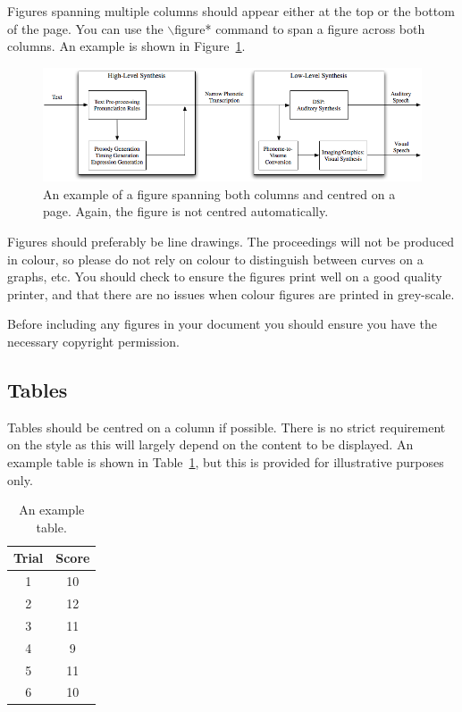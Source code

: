 \documentclass{cmppgr}
\begin{document}
Figures spanning multiple columns should appear either at the top or the bottom of the page. You can use the $\backslash$figure* command to span a figure across both columns. An example is shown in Figure~\ref{fig:pagefigure}.

\begin{figure}[tb]
\centering
\includegraphics[scale=0.5]{AVTTS-Overview}
\caption{An example of a figure spanning both columns and centred on a page. Again, the figure is not centred automatically.}
\label{fig:pagefigure}
\end{figure}

Figures should preferably be line drawings. The proceedings will not be produced in colour, so please do not rely on colour to distinguish between curves on a graphs, etc. You should check to ensure the figures print well on a good quality printer, and that there are no issues when colour figures are printed in grey-scale.

Before including any figures in your document you should ensure you have the necessary copyright permission.

\subsection{Tables}

Tables should be centred on a column if possible. There is no strict requirement on the style as this will largely depend on the content to be displayed. An example table is shown in Table~\ref{tab:example}, but this is provided for illustrative purposes only.

\begin{table}[h]
\centering
\caption{An example table.}
\begin{tabular}{|c|c|}
\hline
Trial & Score \\\hline\hline
1 & 10 \\
2 & 12 \\
3 & 11 \\
4 & 9 \\
5 & 11 \\
6 & 10 \\\hline
\end{tabular}
\label{tab:example}
\end{table}
\end{document}
